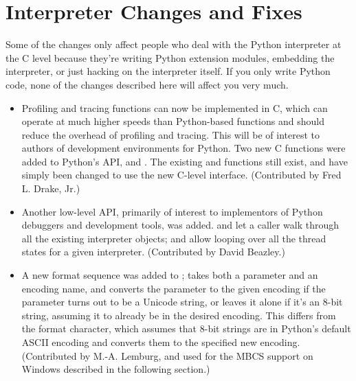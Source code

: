 \documentclass{howto}
\begin{document}
\section{Interpreter Changes and Fixes}

Some of the changes only affect people who deal with the Python
interpreter at the C level because they're writing Python extension modules,
embedding the interpreter, or just hacking on the interpreter itself.
If you only write Python code, none of the changes described here will
affect you very much.

\begin{itemize}

  \item Profiling and tracing functions can now be implemented in C,
  which can operate at much higher speeds than Python-based functions
  and should reduce the overhead of profiling and tracing.  This 
  will be of interest to authors of development environments for
  Python.  Two new C functions were added to Python's API,
   and .
  The existing  and
   functions still exist, and have simply
  been changed to use the new C-level interface.  (Contributed by Fred
  L. Drake, Jr.)

  \item Another low-level API, primarily of interest to implementors
  of Python debuggers and development tools, was added.
   and
   let a caller walk through all
  the existing interpreter objects;
   and
   allow looping over all the thread
  states for a given interpreter.  (Contributed by David Beazley.)

  \item A new  format sequence was added to
  ;  takes both a parameter and
  an encoding name, and converts the parameter to the given encoding
  if the parameter turns out to be a Unicode string, or leaves it
  alone if it's an 8-bit string, assuming it to already be in the
  desired encoding.  This differs from the  format character,
  which assumes that 8-bit strings are in Python's default ASCII
  encoding and converts them to the specified new encoding.
  (Contributed by M.-A. Lemburg, and used for the MBCS support on
  Windows described in the following section.)


\end{itemize}
\end{document}
